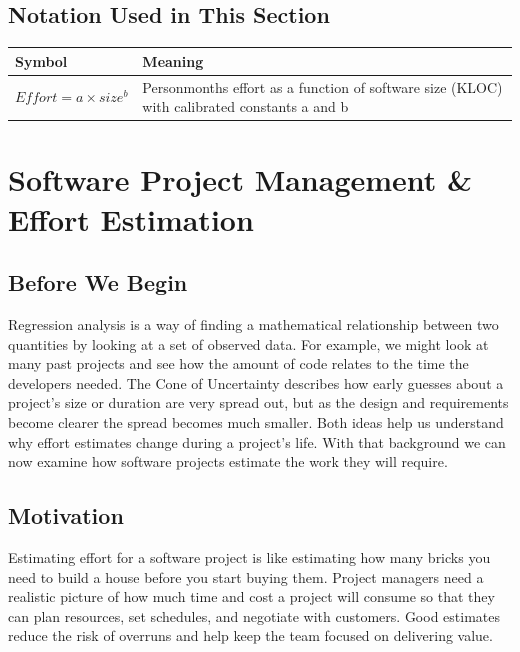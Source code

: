 \documentclass[12pt, a4paper]{article}
\begin{document}
\subsection*{Notation Used in This Section}
\begin{tabular}{@{}ll@{}}
\toprule
Symbol & Meaning \\ \midrule
    $Effort = a \times size^{b}$ & Personmonths effort as a function of software size (KLOC) with calibrated constants a and b \\
\bottomrule
\end{tabular}
\vspace{1em}

\section{Software Project Management \& Effort Estimation}
\subsection{Before We Begin}
Regression analysis is a way of finding a mathematical relationship between two quantities by looking at a set of observed data.  For example, we might look at many past projects and see how the amount of code relates to the time the developers needed.  The Cone of Uncertainty describes how early guesses about a project's size or duration are very spread out, but as the design and requirements become clearer the spread becomes much smaller.  Both ideas help us understand why effort estimates change during a project's life.  With that background we can now examine how software projects estimate the work they will require.

\subsection{Motivation}
Estimating effort for a software project is like estimating how many bricks you need to build a house before you start buying them.  Project managers need a realistic picture of how much time and cost a project will consume so that they can plan resources, set schedules, and negotiate with customers.  Good estimates reduce the risk of overruns and help keep the team focused on delivering value.
\end{document}

